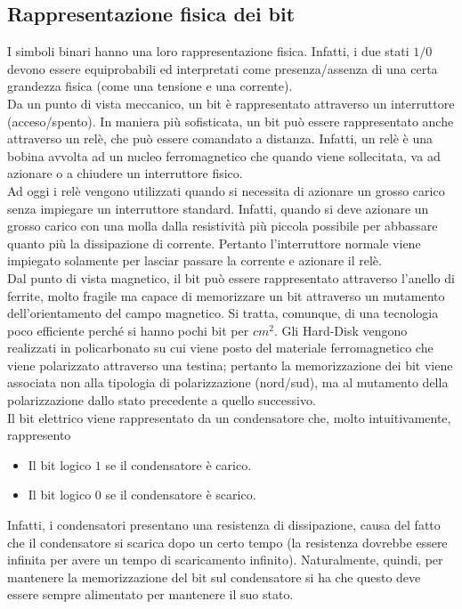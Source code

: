 \documentclass[a4paper]{extarticle}
\begin{document}
\subsection{Rappresentazione fisica dei bit}
I simboli binari hanno una loro rappresentazione fisica. Infatti, i due stati \(1/0\) devono essere equiprobabili ed interpretati come presenza/assenza di una certa grandezza fisica (come una tensione e una corrente).\\
Da un punto di vista meccanico, un bit è rappresentato attraverso un interruttore (acceso/spento). In maniera più sofisticata, un bit può essere rappresentato anche attraverso un relè, che può essere comandato a distanza. Infatti, un relè è una bobina avvolta ad un nucleo ferromagnetico che quando viene sollecitata, va ad azionare o a chiudere un interruttore fisico.\\
Ad oggi i relè vengono utilizzati quando si necessita di azionare un grosso carico senza impiegare un interruttore standard. Infatti, quando si deve azionare un grosso carico con una molla dalla resistività più piccola possibile per abbassare quanto più la dissipazione di corrente. Pertanto l'interruttore normale viene impiegato solamente per lasciar passare la corrente e azionare il relè.\\
Dal punto di vista magnetico, il bit può essere rappresentato attraverso l'anello di ferrite, molto fragile ma capace di memorizzare un bit attraverso un mutamento dell'orientamento del campo magnetico. Si tratta, comunque, di una tecnologia poco efficiente perché si hanno pochi bit per \(cm^2\).
Gli Hard-Disk vengono realizzati in policarbonato su cui viene posto del materiale ferromagnetico che viene polarizzato attraverso una testina; pertanto la memorizzazione dei bit viene associata non alla tipologia di polarizzazione (nord/sud), ma al mutamento della polarizzazione dallo stato precedente a quello successivo.\\
Il bit elettrico viene rappresentato da un condensatore che, molto intuitivamente, rappresento
\begin{itemize}
    \item Il bit logico \(1\) se il condensatore è carico.
    \item Il bit logico \(0\) se il condensatore è scarico.
\end{itemize}
Infatti, i condensatori presentano una resistenza di dissipazione, causa del fatto che il condensatore si scarica dopo un certo tempo (la resistenza dovrebbe essere infinita per avere un tempo di scaricamento infinito). Naturalmente, quindi, per mantenere la memorizzazione del bit sul condensatore si ha che questo deve essere sempre alimentato per mantenere il suo stato.\\
\end{document}
